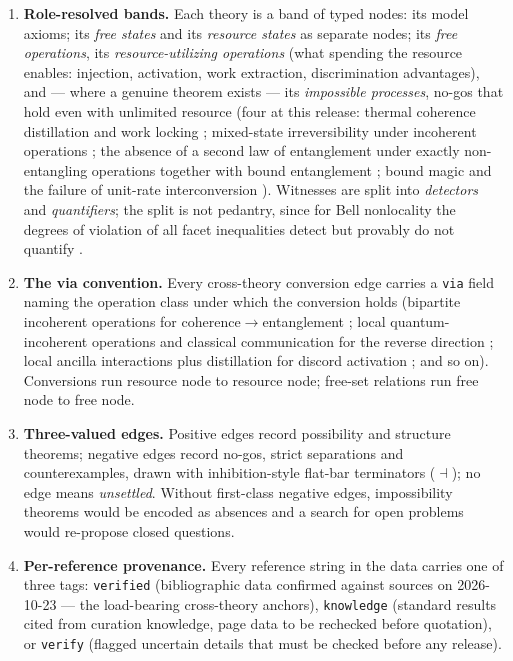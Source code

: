 \documentclass[11pt,a4paper]{article}
\theoremstyle{definition}
\begin{document}
\begin{enumerate}
  \item \textbf{Role-resolved bands.} Each theory is a band of typed nodes:
  its model axioms; its \emph{free states} and its \emph{resource states} as
  separate nodes; its \emph{free operations}, its \emph{resource-utilizing
  operations} (what spending the resource enables: injection, activation,
  work extraction, discrimination advantages), and --- where a genuine
  theorem exists --- its \emph{impossible processes}, no-gos that hold even
  with unlimited resource (four at this release: thermal coherence
  distillation and work locking \cite{marvian2020,lostaglio2015natcomm};
  mixed-state irreversibility under incoherent operations
  \cite{winteryang2016}; the absence of a second law of entanglement under
  exactly non-entangling operations together with bound entanglement
  \cite{lamiregula2023,horodecki2009}; bound magic and the failure of
  unit-rate interconversion \cite{veitch2012}). Witnesses are split into
  \emph{detectors} and \emph{quantifiers}; the split is not pedantry, since
  for Bell nonlocality the degrees of violation of all facet inequalities
  detect but provably do not quantify \cite{wolfe2020}.

  \item \textbf{The via convention.} Every cross-theory conversion edge
  carries a \texttt{via} field naming the operation class under which the
  conversion holds (bipartite incoherent operations for
  coherence$\to$entanglement \cite{streltsov2015}; local
  quantum-incoherent operations and classical communication for the reverse
  direction \cite{chitambarhsieh2016}; local ancilla interactions plus
  distillation for discord activation \cite{piani2011,streltsov2011}; and so
  on). Conversions run resource node to resource node; free-set relations run
  free node to free node.

  \item \textbf{Three-valued edges.} Positive edges record possibility and
  structure theorems; negative edges record no-gos, strict separations and
  counterexamples, drawn with inhibition-style flat-bar terminators
  ($\dashv$); no edge means \emph{unsettled}. Without first-class negative
  edges, impossibility theorems would be encoded as absences and a search for
  open problems would re-propose closed questions.

  \item \textbf{Per-reference provenance.} Every reference string in the data
  carries one of three tags: \texttt{verified} (bibliographic data confirmed
  against sources on 2026-10-23 --- the load-bearing cross-theory anchors),
  \texttt{knowledge} (standard results cited from curation knowledge, page
  data to be rechecked before quotation), or \texttt{verify} (flagged
  uncertain details that must be checked before any release).
\end{enumerate}
\end{document}
